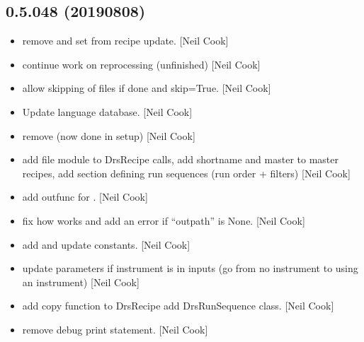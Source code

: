\documentclass[a4paper,10pt,english]{report}
\begin{document}
\subsection{0.5.048 (2019\sphinxhyphen{}08\sphinxhyphen{}08)}
\label{\detokenize{misc/changelog:id113}}\begin{itemize}
\item {} 
 \sphinxhyphen{} remove  and set  from
recipe update. {[}Neil Cook{]}

\item {} 
 \sphinxhyphen{} continue work on reprocessing
(unfinished) {[}Neil Cook{]}

\item {} 
 \sphinxhyphen{} allow skipping of files if done and
\textendash{}skip=True. {[}Neil Cook{]}

\item {} 
Update language database. {[}Neil Cook{]}

\item {} 
 \sphinxhyphen{} remove  (now done in setup) {[}Neil
Cook{]}

\item {} 
 \sphinxhyphen{} add file module to
DrsRecipe calls, add shortname and master to master recipes, add
section defining run sequences (run order + filters) {[}Neil Cook{]}

\item {} 
 \sphinxhyphen{} add outfunc for . {[}Neil Cook{]}

\item {} 
 \sphinxhyphen{} fix how 
works and add an error if “outpath” is None. {[}Neil Cook{]}

\item {} 
 \sphinxhyphen{} add and update constants.
{[}Neil Cook{]}

\item {} 
 \sphinxhyphen{} update parameters if instrument is in inputs (go from
no instrument to using an instrument) {[}Neil Cook{]}

\item {} 
 \sphinxhyphen{} add copy function to DrsRecipe add DrsRunSequence
class. {[}Neil Cook{]}

\item {} 
 \sphinxhyphen{} remove debug print statement. {[}Neil Cook{]}

\end{itemize}
\end{document}
